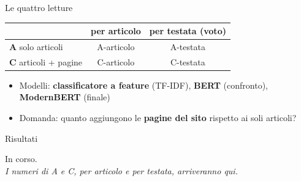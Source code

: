 \documentclass[aspectratio=169]{beamer}
\newcommand{\hl}[1]{\textbf{#1}}
\begin{document}
\begin{frame}{Le quattro letture}
  \vspace{0.5em}
  \centering
  \begin{tabular}{lcc}
    \toprule
    & \textbf{per articolo} & \textbf{per testata (voto)} \\
    \midrule
    \textbf{A} solo articoli & A-articolo & A-testata \\
    \textbf{C} articoli + pagine & C-articolo & C-testata \\
    \bottomrule
  \end{tabular}
  \vspace{1em}
  \begin{itemize}[<+->]
    \item Modelli: \hl{classificatore a feature} (TF-IDF), \hl{BERT} (confronto), \hl{ModernBERT} (finale)
    \item Domanda: quanto aggiungono le \hl{pagine del sito} rispetto ai soli articoli?
  \end{itemize}
\end{frame}

\begin{frame}{Risultati}
  \vfill
  \begin{center}
    {\large In corso.}\\[1em]
    \itshape I numeri di A e C, per articolo e per testata, arriveranno qui.
  \end{center}
  \vfill
\end{frame}
\end{document}
